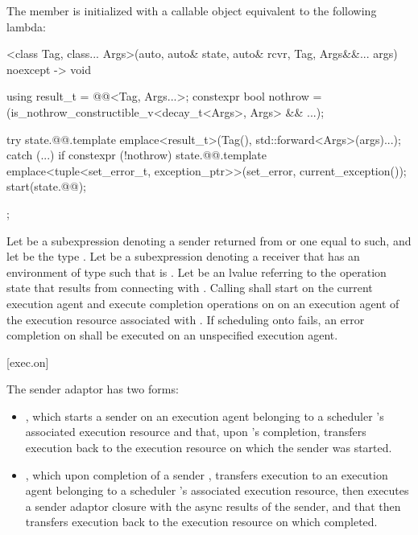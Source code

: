 \pnum
The member 
is initialized with a callable object equivalent to the following lambda:
\begin{codeblock}
[]<class Tag, class... Args>(auto, auto& state, auto& rcvr, Tag, Args&&... args) noexcept
    -> void {
  using result_t = @@<Tag, Args...>;
  constexpr bool nothrow = (is_nothrow_constructible_v<decay_t<Args>, Args> && ...);

  try {
    state.@@.template emplace<result_t>(Tag(), std::forward<Args>(args)...);
  } catch (...) {
    if constexpr (!nothrow)
      state.@@.template emplace<tuple<set_error_t,
                                                exception_ptr>>(set_error, current_exception());
  }
  start(state.@@);
};
\end{codeblock}

\pnum
Let  be a subexpression denoting
a sender returned from  or one equal to such,
and let  be the type .
Let  be a subexpression denoting a receiver
that has an environment of type 
such that  is .
Let  be an lvalue referring to the operation state
that results from connecting  with .
Calling  shall
start  on the current execution agent and
execute completion operations on 
on an execution agent of the execution resource associated with .
If scheduling onto  fails,
an error completion on  shall be executed
on an unspecified execution agent.

[exec.on]{}

\pnum
The  sender adaptor has two forms:
\begin{itemize}
\item
{},
which starts a sender  on an execution agent
belonging to a scheduler 's associated execution resource and
that, upon 's completion,
transfers execution back to the execution resource
on which the  sender was started.
\item
{},
which upon completion of a sender ,
transfers execution to an execution agent
belonging to a scheduler 's associated execution resource,
then executes a sender adaptor closure 
with the async results of the sender, and
that then transfers execution back to the execution resource
on which  completed.
\end{itemize}

